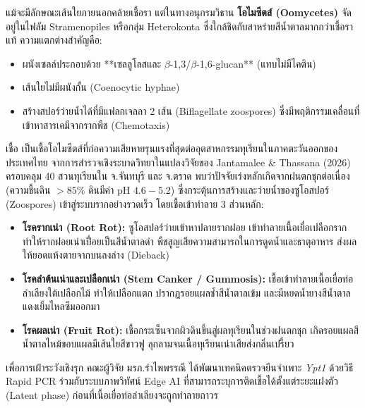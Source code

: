แม้จะมีลักษณะเส้นใยภายนอกคล้ายเชื้อรา แต่ในทางอนุกรมวิธาน \textbf{โอไมซีตส์ (Oomycetes)} จัดอยู่ในไฟลัม Stramenopiles หรือกลุ่ม Heterokonta ซึ่งใกล้ชิดกับสาหร่ายสีน้ำตาลมากกว่าเชื้อราแท้ ความแตกต่างสำคัญคือ:
\begin{itemize}
    \item ผนังเซลล์ประกอบด้วย **เซลลูโลสและ $\beta$-1,3/$\beta$-1,6-glucan** (แทบไม่มีไคติน)
    \item เส้นใยไม่มีผนังกั้น (Coenocytic hyphae)
    \item สร้างสปอร์ว่ายน้ำได้ที่มีแฟลกเจลลา 2 เส้น (Biflagellate zoospores) ซึ่งมีพฤติกรรมเคลื่อนที่เข้าหาสารเคมีจากรากพืช (Chemotaxis)
\end{itemize}

\begin{pathogen}
เชื้อ  เป็นเชื้อโอไมซีตส์ที่ก่อความเสียหายรุนแรงที่สุดต่ออุตสาหกรรมทุเรียนในภาคตะวันออกของประเทศไทย จากการสำรวจเชิงระบาดวิทยาในแปลงวิจัยของ Jantamalee \& Thassana (2026) \cite{jantamalee_2026_biotech} ครอบคลุม 40 สวนทุเรียนใน จ.จันทบุรี และ จ.ตราด พบว่าปัจจัยเร่งหลักเกิดจากฝนตกชุกต่อเนื่อง (ความชื้นดิน $>85\%$ ดินมีค่า $\text{pH } 4.6 - 5.2$) ซึ่งกระตุ้นการสร้างและว่ายน้ำของซูโอสปอร์ (Zoospores) เข้าสู่ระบบรากอย่างรวดเร็ว โดยเชื้อเข้าทำลาย 3 ส่วนหลัก:
\begin{itemize}
    \item \textbf{โรครากเน่า (Root Rot):} ซูโอสปอร์ว่ายเข้าหาปลายรากฝอย เข้าทำลายเนื้อเยื่อเปลือกราก ทำให้รากฝอยเน่าเปื่อยเป็นสีน้ำตาลดำ พืชสูญเสียความสามารถในการดูดน้ำและธาตุอาหาร ส่งผลให้ยอดแห้งตายจากบนลงล่าง (Dieback)
    \item \textbf{โรคลำต้นเน่าและเปลือกเน่า (Stem Canker / Gummosis):} เชื้อเข้าทำลายเนื้อเยื่อท่อลำเลียงใต้เปลือกไม้ ทำให้เปลือกแตก ปรากฏรอยแผลช้ำสีน้ำตาลเข้ม และมีหยดน้ำยางสีน้ำตาลแดงเยิ้มไหลซึมออกมา
    \item \textbf{โรคผลเน่า (Fruit Rot):} เชื้อกระเซ็นจากผิวดินขึ้นสู่ผลทุเรียนในช่วงฝนตกชุก เกิดรอยแผลสีน้ำตาลไหม้ขอบแผลมีเส้นใยสีขาวฟู ลุกลามจนเนื้อทุเรียนเน่าเสียส่งกลิ่นเปรี้ยว
\end{itemize}
เพื่อการเฝ้าระวังเชิงรุก คณะผู้วิจัย มรภ.รำไพพรรณี ได้พัฒนาเทคนิคตรวจยีนจำเพาะ \textit{Ypt1} ด้วยวิธี Rapid PCR ร่วมกับระบบภาพวิทัศน์ Edge AI \cite{tsana2026edge} ที่สามารถระบุการติดเชื้อได้ตั้งแต่ระยะแฝงตัว (Latent phase) ก่อนที่เนื้อเยื่อท่อลำเลียงจะถูกทำลายถาวร
\end{pathogen}

